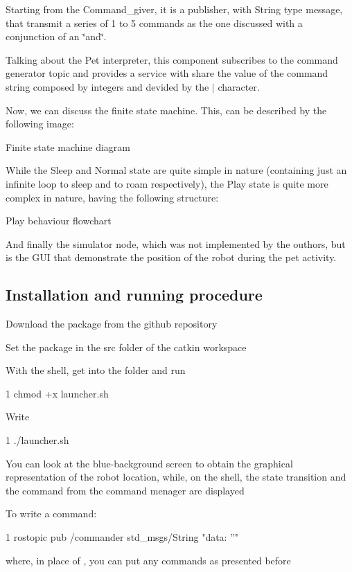 Starting from the Command\+\_\+giver, it is a publisher, with String type message, that transmit a series of 1 to 5 commands as the one discussed with a conjunction of an \char`\"{}and\char`\"{}.

Talking about the Pet interpreter, this component subscribes to the command generator topic and provides a service with share the value of the command string composed by integers and devided by the \textquotesingle{}$\vert$\textquotesingle{} character.

Now, we can discuss the finite state machine. This, can be described by the following image\+:

 \begin{center}Finite state machine diagram\end{center}  While the \textquotesingle{}Sleep\textquotesingle{} and \textquotesingle{}Normal\textquotesingle{} state are quite simple in nature (containing just an infinite loop to sleep and to roam respectively), the \textquotesingle{}Play\textquotesingle{} state is quite more complex in nature, having the following structure\+:  \begin{center}Play behaviour flowchart\end{center} 

And finally the simulator node, which was not implemented by the outhors, but is the G\+UI that demonstrate the position of the robot during the pet activity.

\subsection*{Installation and running procedure}


\begin{DoxyItemize}
\item Download the package from the github repository
\item Set the package in the src folder of the catkin workspace
\item With the shell, get into the folder and run 
\begin{DoxyCode}
1 chmod +x launcher.sh
\end{DoxyCode}

\item Write 
\begin{DoxyCode}
1 ./launcher.sh
\end{DoxyCode}

\item You can look at the blue-\/background screen to obtain the graphical representation of the robot location, while, on the shell, the state transition and the command from the command menager are displayed
\item To write a command\+: 
\begin{DoxyCode}
1 rostopic pub /commander std\_msgs/String "data: ''" 
\end{DoxyCode}
 where, in place of \textquotesingle{}\textquotesingle{}, you can put any commands as presented before
\end{DoxyItemize}


